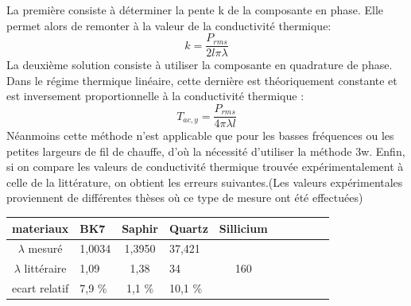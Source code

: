 \documentclass[10pt,a4paper]{report}
\begin{document}
\newline
\newline
La première consiste à déterminer la pente k de la composante en phase. Elle permet alors de remonter à la valeur de la conductivité thermique:
\begin{equation}
k=\frac{P_{rms}}{2l\pi \lambda}
\end{equation}
\newline
La deuxième solution consiste à utiliser la composante en quadrature de phase. Dans le régime thermique linéaire, cette dernière est théoriquement constante et est inversement proportionnelle à la conductivité thermique :
\begin{equation}
T_{ac,y}=\frac{P_{rms}}{4\pi \lambda l}
\end{equation}
Néanmoins cette méthode n'est applicable que pour les basses fréquences ou les petites largeurs de fil de chauffe, d'où la nécessité d'utiliser la méthode 3w.
\newline
\newline
Enfin, si on compare les valeurs de conductivité thermique trouvée expérimentalement à celle de la littérature, on obtient les erreurs suivantes.(Les valeurs expérimentales proviennent de différentes thèses où ce type de mesure ont été effectuées)
\begin{center}
\begin{tabular}{|c|p{3cm}|c|p{3cm}|c|p{3cm}|c|p{3cm}||c|p{3cm}|}\hline
materiaux & BK7 & Saphir & Quartz & Sillicium\\\hline
$\lambda$ mesuré & 1,0034  & 1,3950 & 37,421\\\hline
$\lambda$ littéraire &  1,09 & 1,38 & 34 & 160\\\hline
ecart relatif & 7,9 \% & 1,1 \% & 10,1 \% & \\\hline
\end{tabular}
\end{center}
\end{document}
